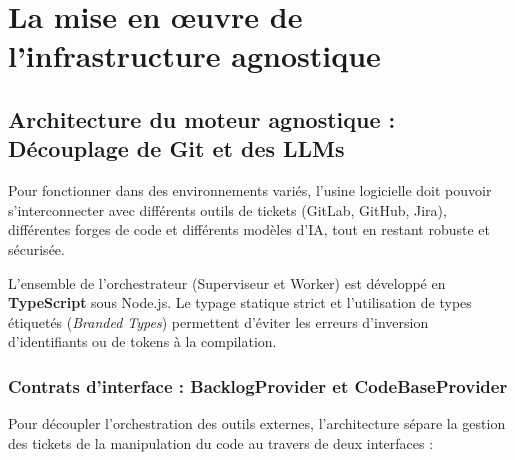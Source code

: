 \documentclass{tnreport}
\begin{document}
\cleardoublepage

\cleardoublepage

\chapter{La mise en œuvre de l'infrastructure agnostique}
\label{chap:infra_agnostique}

\section{Architecture du moteur agnostique : Découplage de Git et des LLMs}
\label{sec:architecture_moteur}

Pour fonctionner dans des environnements variés, l'usine logicielle doit pouvoir s'interconnecter avec différents outils de tickets (GitLab, GitHub, Jira), différentes forges de code et différents modèles d'IA, tout en restant robuste et sécurisée.

L'ensemble de l'orchestrateur (Superviseur et Worker) est développé en \textbf{TypeScript} sous Node.js. Le typage statique strict et l'utilisation de types étiquetés (\textit{Branded Types}) permettent d'éviter les erreurs d'inversion d'identifiants ou de tokens à la compilation.

\subsection{Contrats d'interface : BacklogProvider et CodeBaseProvider}
\label{subsec:interfaces_providers}

Pour découpler l'orchestration des outils externes, l'architecture sépare la gestion des tickets de la manipulation du code au travers de deux interfaces :
\end{document}
